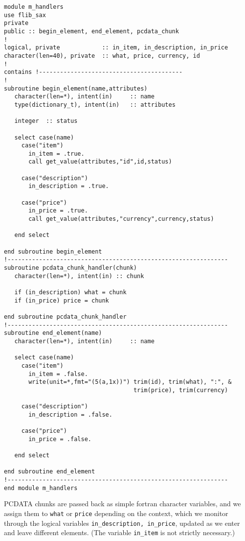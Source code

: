 \documentclass[11pt]{article}
\begin{document}
\begin{verbatim}
module m_handlers
use flib_sax
private
public :: begin_element, end_element, pcdata_chunk
!
logical, private            :: in_item, in_description, in_price
character(len=40), private  :: what, price, currency, id
!
contains !-----------------------------------------
!
subroutine begin_element(name,attributes)
   character(len=*), intent(in)     :: name
   type(dictionary_t), intent(in)   :: attributes
   
   integer  :: status
   
   select case(name)
     case("item")
       in_item = .true.
       call get_value(attributes,"id",id,status)
     
     case("description")
       in_description = .true.
       
     case("price")
       in_price = .true.
       call get_value(attributes,"currency",currency,status)

   end select
   
end subroutine begin_element
!---------------------------------------------------------------
subroutine pcdata_chunk_handler(chunk)
   character(len=*), intent(in) :: chunk

   if (in_description) what = chunk
   if (in_price) price = chunk

end subroutine pcdata_chunk_handler
!---------------------------------------------------------------
subroutine end_element(name)
   character(len=*), intent(in)     :: name
   
   select case(name)
     case("item")
       in_item = .false.
       write(unit=*,fmt="(5(a,1x))") trim(id), trim(what), ":", &
                                     trim(price), trim(currency)
     
     case("description")
       in_description = .false.
       
     case("price")
       in_price = .false.

   end select
   
end subroutine end_element
!---------------------------------------------------------------
end module m_handlers
\end{verbatim}
%
PCDATA chunks are passed back as simple fortran character variables,
and we assign them to \texttt{what} or \texttt{price} depending on the
context, which we monitor through the logical variables
\texttt{in\_description, in\_price}, updated as we enter and leave
different elements. (The variable \texttt{in\_item} is not strictly
necessary.)
\end{document}
